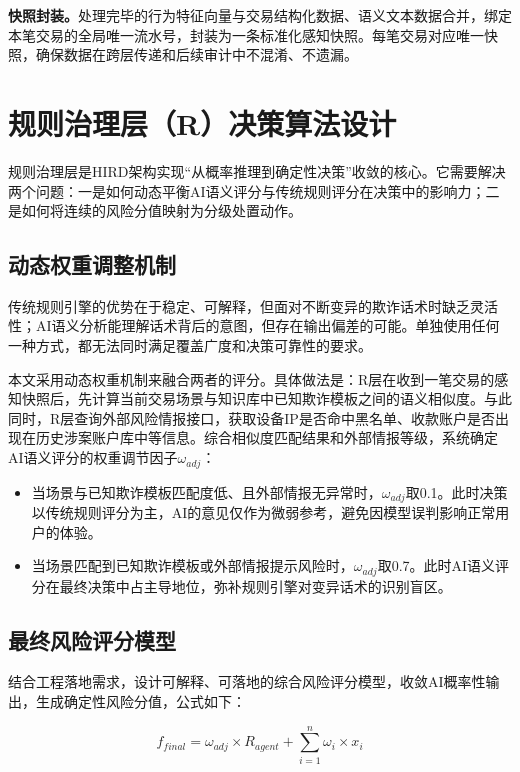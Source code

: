 \documentclass[twoside,openright]{xduugthesis}
\begin{document}
\textbf{快照封装。}处理完毕的行为特征向量与交易结构化数据、语义文本数据合并，绑定本笔交易的全局唯一流水号，封装为一条标准化感知快照。每笔交易对应唯一快照，确保数据在跨层传递和后续审计中不混淆、不遗漏。

\section{规则治理层（R）决策算法设计}

规则治理层是HIRD架构实现“从概率推理到确定性决策”收敛的核心。它需要解决两个问题：一是如何动态平衡AI语义评分与传统规则评分在决策中的影响力；二是如何将连续的风险分值映射为分级处置动作。

\subsection{动态权重调整机制}

传统规则引擎的优势在于稳定、可解释，但面对不断变异的欺诈话术时缺乏灵活性；AI语义分析能理解话术背后的意图，但存在输出偏差的可能\cite{haeri2025riskembed}。单独使用任何一种方式，都无法同时满足覆盖广度和决策可靠性的要求。

本文采用动态权重机制来融合两者的评分。具体做法是：R层在收到一笔交易的感知快照后，先计算当前交易场景与知识库中已知欺诈模板之间的语义相似度。与此同时，R层查询外部风险情报接口，获取设备IP是否命中黑名单、收款账户是否出现在历史涉案账户库中等信息。综合相似度匹配结果和外部情报等级，系统确定AI语义评分的权重调节因子$\omega_{adj}$：

\begin{itemize}
    \item 当场景与已知欺诈模板匹配度低、且外部情报无异常时，$\omega_{adj}$取0.1。此时决策以传统规则评分为主，AI的意见仅作为微弱参考，避免因模型误判影响正常用户的体验。
    \item 当场景匹配到已知欺诈模板或外部情报提示风险时，$\omega_{adj}$取0.7。此时AI语义评分在最终决策中占主导地位，弥补规则引擎对变异话术的识别盲区。
\end{itemize}

\subsection{最终风险评分模型}

结合工程落地需求，设计可解释、可落地的综合风险评分模型，收敛AI概率性输出，生成确定性风险分值，公式如下：

\begin{equation}
f_{final} = \omega_{adj} \times R_{agent} + \sum_{i=1}^{n} \omega_i \times x_i
\label{eq:final-score}
\end{equation}
\end{document}
